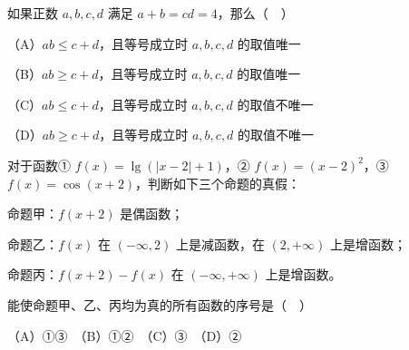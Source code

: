 \begin{question}
如果正数 $a,b,c,d$ 满足 $a+b=cd=4$，那么（　）

（A）$ab\leq c+d$，且等号成立时 $a,b,c,d$ 的取值唯一

（B）$ab\geq c+d$，且等号成立时 $a,b,c,d$ 的取值唯一

（C）$ab\leq c+d$，且等号成立时 $a,b,c,d$ 的取值不唯一

（D）$ab\geq c+d$，且等号成立时 $a,b,c,d$ 的取值不唯一

\end{question}
\begin{question}
对于函数① $f(x)=\lg(|x-2|+1)$，② $f(x)=(x-2)^2$，③ $f(x)=\cos(x+2)$，判断如下三个命题的真假：

命题甲：$f(x+2)$ 是偶函数；

命题乙：$f(x)$ 在 $(-\infty,2)$ 上是减函数，在 $(2,+\infty)$ 上是增函数；

命题丙：$f(x+2)-f(x)$ 在 $(-\infty,+\infty)$ 上是增函数。

能使命题甲、乙、丙均为真的所有函数的序号是（　）

（A）①③　（B）①②　（C）③　（D）②

\end{question}

